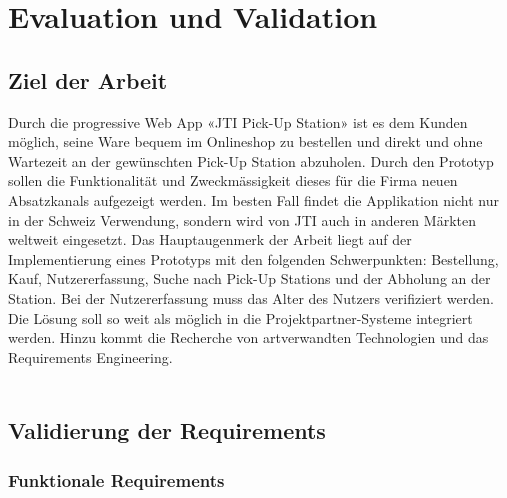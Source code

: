 \section{Evaluation und Validation}\label{Evaluation}
\subsection{Ziel der Arbeit}
Durch die progressive Web App «JTI Pick-Up Station» ist es dem Kunden möglich, seine Ware bequem im Onlineshop zu bestellen und direkt und ohne Wartezeit an der gewünschten Pick-Up Station abzuholen. Durch den Prototyp sollen die Funktionalität und Zweckmässigkeit dieses für die Firma neuen Absatzkanals aufgezeigt werden. Im besten Fall findet die Applikation nicht nur in der Schweiz Verwendung, sondern wird von JTI auch in anderen Märkten weltweit eingesetzt. Das Hauptaugenmerk der Arbeit liegt auf der Implementierung eines Prototyps mit den folgenden Schwerpunkten: Bestellung, Kauf, Nutzererfassung, Suche nach Pick-Up Stations und der Abholung an der Station. Bei der Nutzererfassung muss das Alter des Nutzers verifiziert werden. Die Lösung soll so weit als möglich in die Projektpartner-Systeme integriert werden. Hinzu kommt die Recherche von artverwandten Technologien und das Requirements Engineering. \\\\

\subsection{Validierung der Requirements}
\subsubsection{Funktionale Requirements}

